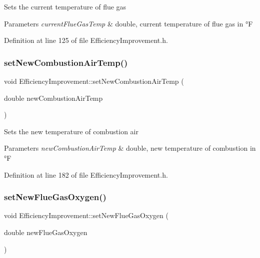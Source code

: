 Sets the current temperature of flue gas


\begin{DoxyParams}{Parameters}
{\em current\+Flue\+Gas\+Temp} & double, current temperature of flue gas in °F \\
\hline
\end{DoxyParams}


Definition at line 125 of file Efficiency\+Improvement.\+h.

\mbox{\label{class_efficiency_improvement_a93705877dfad913c6282fbd31e66c41a}} 
\subsubsection{\texorpdfstring{set\+New\+Combustion\+Air\+Temp()}{setNewCombustionAirTemp()}}
{\footnotesize\ttfamily void Efficiency\+Improvement\+::set\+New\+Combustion\+Air\+Temp (\begin{DoxyParamCaption}\item[{double}]{new\+Combustion\+Air\+Temp }\end{DoxyParamCaption})\hspace{0.3cm}{\ttfamily [inline]}}

Sets the new temperature of combustion air


\begin{DoxyParams}{Parameters}
{\em new\+Combustion\+Air\+Temp} & double, new temperature of combustion in °F \\
\hline
\end{DoxyParams}


Definition at line 182 of file Efficiency\+Improvement.\+h.

\mbox{\label{class_efficiency_improvement_a111f7e30d302b4e71103a2ec6d199e2c}} 
\subsubsection{\texorpdfstring{set\+New\+Flue\+Gas\+Oxygen()}{setNewFlueGasOxygen()}}
{\footnotesize\ttfamily void Efficiency\+Improvement\+::set\+New\+Flue\+Gas\+Oxygen (\begin{DoxyParamCaption}\item[{double}]{new\+Flue\+Gas\+Oxygen }\end{DoxyParamCaption})\hspace{0.3cm}{\ttfamily [inline]}}

